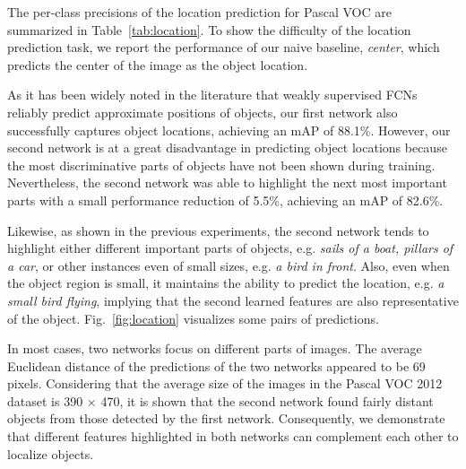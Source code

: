 \documentclass[10pt,twocolumn,letterpaper]{article}
\newcommand{\figref}[1]{Fig.~\ref{#1}}
\newcommand{\tabfref}[1]{Table~\ref{#1}}
\begin{document}
The per-class precisions of the location prediction for Pascal VOC are summarized in \tabfref{tab:location}. To show the difficulty of the location prediction task, we report the performance of our naive baseline, \textit{center}, which predicts the center of the image as the object location.

As it has been widely noted in the literature \cite{zhou2016cvpr, Oquab15, SimonyanVZ13bg, kolesnikov2016seed} that weakly supervised FCNs reliably predict approximate positions of objects, our first network also successfully captures object locations, achieving an mAP of 88.1\%. However, our second network is at a great disadvantage in predicting object locations because the most discriminative parts of objects have not been shown during training. Nevertheless, the second network was able to highlight the next most important parts with a small performance reduction of 5.5\%, achieving an mAP of 82.6\%.

Likewise, as shown in the previous experiments, the second network tends to highlight either different important parts of objects, e.g. \textit{sails of a boat, pillars of a car}, or other instances even of small sizes, e.g. \textit{a bird in front}. Also, even when the object region is small, it maintains the ability to predict the location, e.g. \textit{a small bird flying}, implying that the second learned features are also representative of the object. \figref{fig:location} visualizes some pairs of predictions.

In most cases, two networks focus on different parts of images. The average Euclidean distance of the predictions of the two networks appeared to be 69 pixels. Considering that the average size of the images in the Pascal VOC 2012 dataset is 390 $\times$ 470, it is shown that the second network found fairly distant objects from those detected by the first network. Consequently, we demonstrate that different features highlighted in both networks can complement each other to localize objects.


\end{document}
